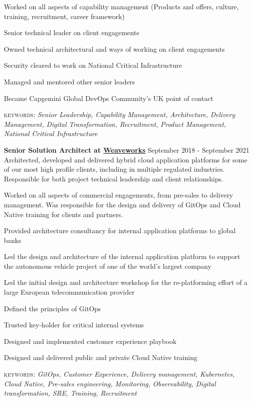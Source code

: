 \documentclass[10pt]{article}
\newcommand{\linkto}[2]{\href{#1}{\color{darkblue}\setulcolor{darkblue}\ul{#2}}}
\newcommand{\blankline}{\quad\pagebreak[2]}
\begin{document}
\begin{myitemize}
        \item Worked on all aspects of capability management (Products and offers, culture, training, recruitment, career framework)
        \item Senior technical leader on client engagements
        \item Owned technical architectural and ways of working on client engagements
        \item Security cleared to work on National Critical Infrastructure
        \item Managed and mentored other senior leaders
        \item Became Capgemini Global DevOps Community's UK point of contact
\end{myitemize}

{\small \textsc{keywords:} \emph{Senior Leadership, Capability Management, Architecture, Delivery Management, Digital Transformation, Recruitment, Product Management, National Critical Infrastructure}}

\blankline

\textbf{Senior Solution Architect at \linkto{https://weave.works}{Weaveworks}} \hfill September 2018 - September 2021\\
Architected, developed and delivered hybrid cloud application platforms for some of our most high profile clients, including in multiple regulated industries. Responsible for both project technical leadership and client relationships. 

\blankline 

Worked on all aspects of commercial engagements, from pre-sales to delivery management. Was responsible for the design and delivery of GitOps and Cloud Native training for clients and partners. 

\begin{myitemize}
        \item Provided architecture consultancy for internal application platforms to global banks
        \item Led the design and architecture of the internal application platform to support the autonomous vehicle project of one of the world's largest company 
        \item Led the initial design and architecture workshop for the re-platforming effort of a large European telecommunication provider
        \item Defined the principles of GitOps
        \item Trusted key-holder for critical internal systems
        \item Designed and implemented customer experience playbook
        \item Designed and delivered public and private Cloud Native training
\end{myitemize}
{\small \textsc{keywords:} \emph{GitOps, Customer Experience, Delivery management, Kubernetes, Cloud Native, Pre-sales engineering, Monitoring, Observability, Digital transformation, SRE, Training, Recruitment}}
\end{document}
